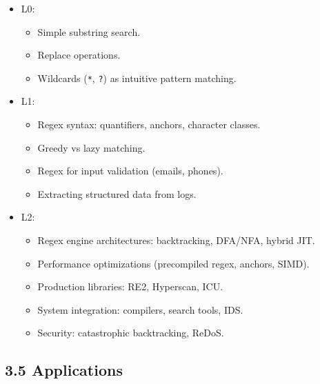 \documentclass[
  letterpaper,
  DIV=11,
  numbers=noendperiod]{scrreprt}
\providecommand{\tightlist}{%
  \setlength{\itemsep}{0pt}\setlength{\parskip}{0pt}}
\begin{document}
\begin{itemize}
\item
  L0:

  \begin{itemize}
  \tightlist
  \item
    Simple substring search.
  \item
    Replace operations.
  \item
    Wildcards (\texttt{*}, \texttt{?}) as intuitive pattern matching.
  \end{itemize}
\item
  L1:

  \begin{itemize}
  \tightlist
  \item
    Regex syntax: quantifiers, anchors, character classes.
  \item
    Greedy vs lazy matching.
  \item
    Regex for input validation (emails, phones).
  \item
    Extracting structured data from logs.
  \end{itemize}
\item
  L2:

  \begin{itemize}
  \tightlist
  \item
    Regex engine architectures: backtracking, DFA/NFA, hybrid JIT.
  \item
    Performance optimizations (precompiled regex, anchors, SIMD).
  \item
    Production libraries: RE2, Hyperscan, ICU.
  \item
    System integration: compilers, search tools, IDS.
  \item
    Security: catastrophic backtracking, ReDoS.
  \end{itemize}
\end{itemize}

\subsection{3.5 Applications}\label{applications-1}
\end{document}
